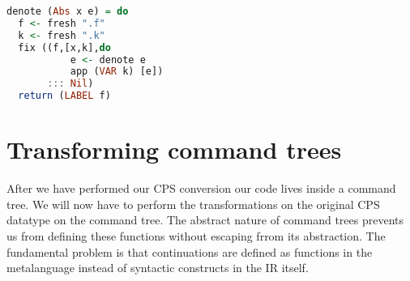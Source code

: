 \begin{lstlisting}[language=Haskell]
denote (Abs x e) = do
  f <- fresh ".f"
  k <- fresh ".k"
  fix ((f,[x,k],do
           e <- denote e
           app (VAR k) [e])
       ::: Nil)
  return (LABEL f)
\end{lstlisting}


\section{\label{section:transcomtree}Transforming command trees}
After we have performed our \ac{CPS} conversion our code lives inside a command tree. We will now have to perform the transformations on the original \ac{CPS} datatype on the command tree. The abstract nature of command trees prevents us from defining these functions without escaping frrom its abstraction. The fundamental problem is that continuations are defined as functions in the metalanguage instead of syntactic constructs in the \ac{IR} itself.

% 
